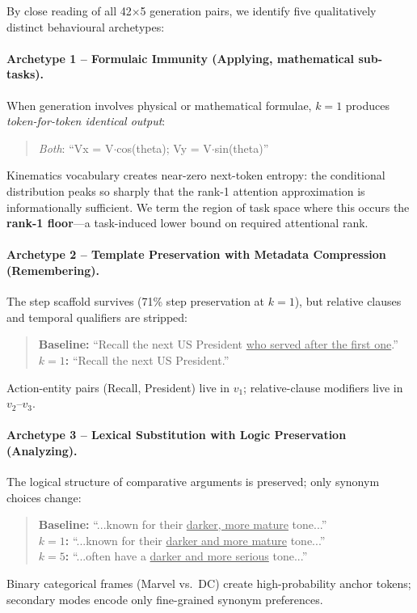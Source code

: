 \documentclass{article}
\begin{document}
By close reading of all 42$\times$5 generation pairs, we identify five
qualitatively distinct behavioural archetypes:

\paragraph{Archetype 1 -- Formulaic Immunity (Applying, mathematical sub-tasks).}
When generation involves physical or mathematical formulae, $k\!=\!1$ produces
\emph{token-for-token identical output}:
\begin{quote}
\small
\textit{Both}: ``Vx = V$\cdot$cos(theta); Vy = V$\cdot$sin(theta)''
\end{quote}
Kinematics vocabulary creates near-zero next-token entropy: the conditional
distribution peaks so sharply that the rank-1 attention approximation is
informationally sufficient.  We term the region of task space where this occurs
the \textbf{rank-1 floor}---a task-induced lower bound on required attentional rank.

\paragraph{Archetype 2 -- Template Preservation with Metadata Compression (Remembering).}
The step scaffold survives (71\% step preservation at $k\!=\!1$), but relative
clauses and temporal qualifiers are stripped:
\begin{quote}
\small
\textbf{Baseline:} ``Recall the next US President \underline{who served after the first one}.''\\
\textbf{$k\!=\!1$:} ``Recall the next US President.''
\end{quote}
Action-entity pairs (Recall, President) live in $v_1$; relative-clause modifiers
live in $v_2$--$v_3$.

\paragraph{Archetype 3 -- Lexical Substitution with Logic Preservation (Analyzing).}
The logical structure of comparative arguments is preserved; only synonym choices
change:
\begin{quote}
\small
\textbf{Baseline:} ``...known for their \underline{darker, more mature} tone...''\\
\textbf{$k\!=\!1$:} ``...known for their \underline{darker and more mature} tone...''\\
\textbf{$k\!=\!5$:} ``...often have a \underline{darker and more serious} tone...''
\end{quote}
Binary categorical frames (Marvel vs.\ DC) create high-probability anchor tokens;
secondary modes encode only fine-grained synonym preferences.
\end{document}
